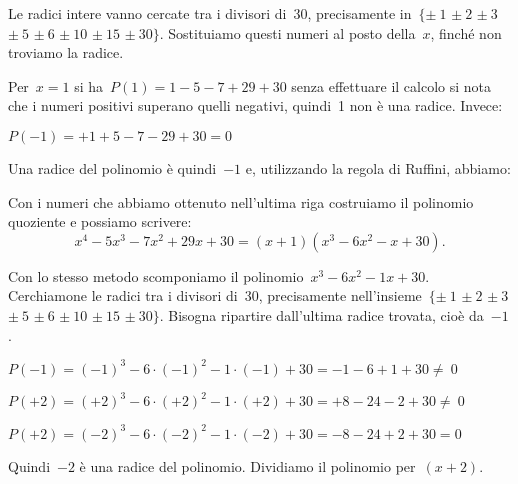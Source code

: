 Le radici intere vanno cercate tra i divisori di~30, precisamente 
in~$\{\pm~1$ $\pm~2$ $\pm~3$ $\pm~5$ $\pm~6$ $\pm~10$
$\pm~15$ $\pm~30\}$.
Sostituiamo questi numeri al posto della~$x$, finché non troviamo la radice.

\begin{multicols}{2}
 
Per~$x=1$ si ha~$P(1)=1-5-7+29+30$ senza effettuare il calcolo si nota che i 
numeri positivi superano quelli negativi, quindi~1 non è una radice. 
Invece:

$P(-1)=+1+5-7-29+30=0$


Una radice del polinomio è quindi~$-1$ e, utilizzando la regola di Ruffini,
abbiamo:
\begin{center}
 
\end{center}

\end{multicols}

Con i numeri che abbiamo ottenuto nell'ultima riga costruiamo il polinomio 
quoziente e possiamo scrivere:
\[x^{4}-5x^{3}-7x^{2}+29x+30=(x+1)(x^{3}-6x^{2}-x+30).\]

Con lo stesso metodo scomponiamo il polinomio~$x^{3}-6x^{2}-1x+30$.
Cerchiamone le radici tra i divisori di~30, precisamente
nell'insieme~$\{\pm~1$ $\pm~2$ $\pm~3$ $\pm~5$ $\pm~6$ $\pm~10$
$\pm~15$ $\pm~30\}$. Bisogna ripartire dall'ultima
radice trovata, cioè da~$-1$.

$P(-1)=(-1)^{3}-6\cdot (-1)^{2}-1\cdot (-1)+30=-1-6+1+30\neq~0$

$P(+2)=(+2)^{3}-6\cdot (+2)^{2}-1\cdot (+2)+30=+8-24-2+30\neq~0$

$P(+2)=(-2)^{3}-6\cdot (-2)^{2}-1\cdot (-2)+30=-8-24+2+30=0$

\begin{multicols}{2}
 
Quindi~$-2$ è una radice del polinomio. Dividiamo il polinomio per~$(x+2)$.
\begin{center}
 
\end{center}

\end{multicols}

